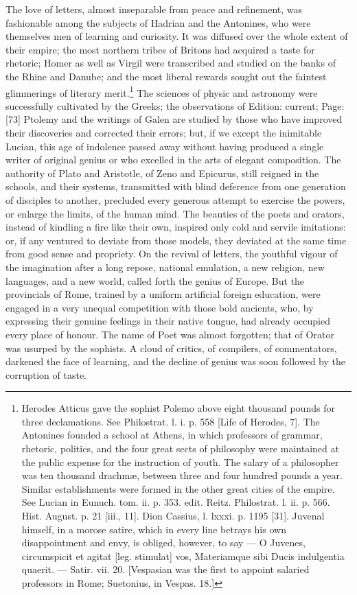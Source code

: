 The love of letters, almost inseparable from peace and refinement, was fashionable among the subjects of Hadrian and the Antonines, who were themselves men of learning and curiosity. It was diffused over the whole extent of their empire; the most northern tribes of Britons had acquired a taste for rhetoric; Homer as well as Virgil were transcribed and studied on the banks of the Rhine and Danube; and the most liberal rewards sought out the faintest glimmerings of literary merit.\footnote{Herodes Atticus gave the sophist Polemo above eight thousand pounds for three declamations. See Philostrat. l. i. p. 558 [Life of Herodes, 7]. The Antonines founded a school at Athens, in which professors of grammar, rhetoric, politics, and the four great sects of philosophy were maintained at the public expense for the instruction of youth. The salary of a philosopher was ten thousand drachmæ, between three and four hundred pounds a year. Similar establishments were formed in the other great cities of the empire. See Lucian in Eunuch. tom. ii. p. 353. edit. Reitz. Philostrat. l. ii. p. 566. Hist. August. p. 21 [iii., 11]. Dion Cassius, l. lxxxi. p. 1195 [31]. Juvenal himself, in a morose satire, which in every line betrays his own disappointment and envy, is obliged, however, to say \texthebrew{—} O Juvenes, circumspicit et agitat [leg. stimulat] vos, Materiamque sibi Ducis indulgentia quaerit. \texthebrew{—} Satir. vii. 20. [Vespasian was the first to appoint salaried professors in Rome; Suetonius, in Vespas. 18.]} The sciences of physic and astronomy were successfully cultivated by the Greeks; the observations of Edition: current; Page: [73] Ptolemy and the writings of Galen are studied by those who have improved their discoveries and corrected their errors; but, if we except the inimitable Lucian, this age of indolence passed away without having produced a single writer of original genius or who excelled in the arts of elegant composition. The authority of Plato and Aristotle, of Zeno and Epicurus, still reigned in the schools, and their systems, transmitted with blind deference from one generation of disciples to another, precluded every generous attempt to exercise the powers, or enlarge the limits, of the human mind. The beauties of the poets and orators, instead of kindling a fire like their own, inspired only cold and servile imitations: or, if any ventured to deviate from those models, they deviated at the same time from good sense and propriety. On the revival of letters, the youthful vigour of the imagination after a long repose, national emulation, a new religion, new languages, and a new world, called forth the genius of Europe. But the provincials of Rome, trained by a uniform artificial foreign education, were engaged in a very unequal competition with those bold ancients, who, by expressing their genuine feelings in their native tongue, had already occupied every place of honour. The name of Poet was almost forgotten; that of Orator was usurped by the sophists. A cloud of critics, of compilers, of commentators, darkened the face of learning, and the decline of genius was soon followed by the corruption of taste.

